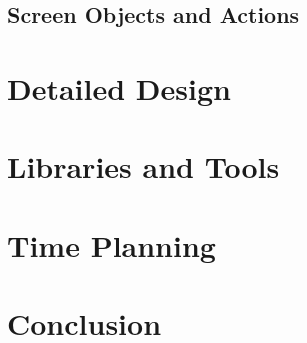 \documentclass[]{report}
\begin{document}
\section{Screen Objects and Actions}

\chapter{Detailed Design}

\chapter{Libraries and Tools}

\chapter{Time Planning}

\chapter{Conclusion}



\end{document}
